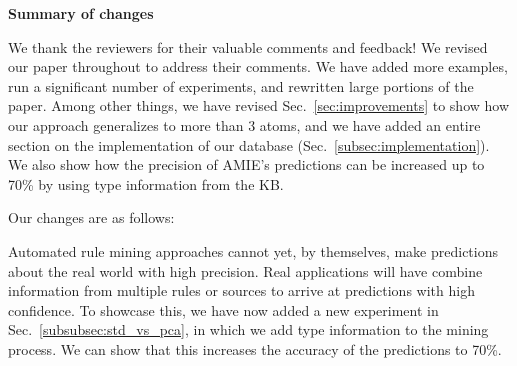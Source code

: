 \onecolumn

  \begin{centering}
   \LARGE\textbf{Summary of changes\\[1cm]}
  \end{centering}
  
	We thank the reviewers for their valuable comments and feedback! We revised our paper throughout to address their comments. We have added more examples, run a significant number of experiments, and rewritten large portions of the paper. 
Among other things, we have revised Sec.~\ref{sec:improvements} to show how our approach generalizes to more than 3 atoms, and we have added an entire section on the implementation of our database (Sec.~\ref{subsec:implementation}). We also show how the precision of AMIE's predictions can be increased up to 70\% by using type information from the KB.
  
  Our changes are as follows:
  
	
    
	Automated rule mining approaches cannot yet, by themselves, make predictions about the real world with high precision. Real applications will have combine information from multiple rules or sources to arrive at predictions with high confidence. To showcase this, we have now added a new experiment in Sec.~\ref{subsubsec:std_vs_pca}, in which we add type information to the mining process. We can show that this increases the accuracy of the predictions to 70\%. 
	
